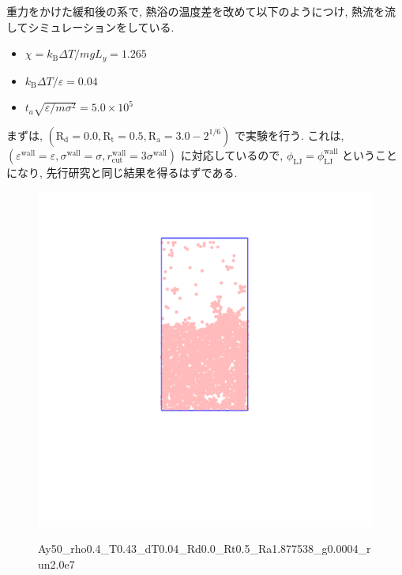 \documentclass[dvipdfmx]{jsarticle}
\numberwithin{equation}{subsection}
\begin{document}
重力をかけた緩和後の系で, 熱浴の温度差を改めて以下のようにつけ, 熱流を流してシミュレーションをしている.

\begin{itemize}
  \item $\chi = k_{\text{B}}\Delta T / mg L_y = 1.265$
  \item $k_{\text{B}} \Delta T/\varepsilon = 0.04$
  \item $t_a \sqrt{\varepsilon / m \sigma^2} = 5.0 \times 10^{5}$
\end{itemize}


まずは, $(\text{R}_\text{d} = 0.0, \text{R}_\text{t} = 0.5, \text{R}_\text{a} = 3.0 - 2^{1/6})$ で実験を行う. これは, $(\varepsilon^{\text{wall}} = \varepsilon, \sigma^{\text{wall}} = \sigma, r^{\text{wall}}_{\text{cut}} = 3\sigma^{\text{wall}})$ に対応しているので, $\phi_{\text{LJ}} = \phi_{\text{LJ}}^{\text{wall}}$ ということになり, 先行研究と同じ結果を得るはずである.

\begin{figure}[H]
  \centering
  \href{https://youtu.be/fxn1mU1ZZFQ}{\includegraphics[scale=0.2]{image/2023-11-13T17:41:52.785__chi1.265_Ay50_rho0.4_T0.43_dT0.04_Rd0.0_Rt0.5_Ra1.877538_g0.0003999718779659611_run2.0e7_output.png}}
  \caption{Ay50\_rho0.4\_T0.43\_dT0.04\_Rd0.0\_Rt0.5\_Ra1.877538\_g0.0004\_run2.0e7}
  \label{}
\end{figure}
\end{document}
